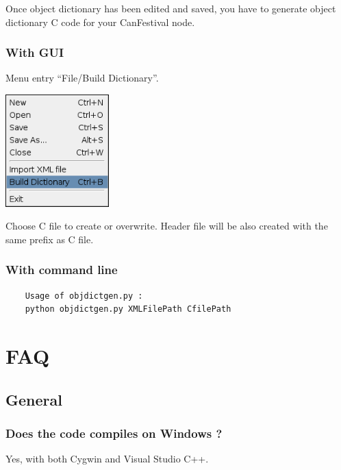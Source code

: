\documentclass[12pt,english,a4paper]{book}
\begin{document}
Once object dictionary has been edited and saved, you have to generate
object dictionary C code for your CanFestival node.


\subsubsection{With GUI}

Menu entry {}``File/Build Dictionary''.

\begin{center}
\includegraphics[width=4cm]{Pictures/10000201000000B7000000C66AF89CD5} 
\par\end{center}

Choose C file to create or overwrite. Header file will be also created
with the same prefix as C file.


\subsubsection{With command line}

\begin{verbatim}
	Usage of objdictgen.py :
	python objdictgen.py XMLFilePath CfilePath
\end{verbatim}



\section{FAQ}


\subsection{General}


\subsubsection{Does the code compiles on Windows ?}

Yes, with both Cygwin and Visual Studio C++. 
\end{document}
